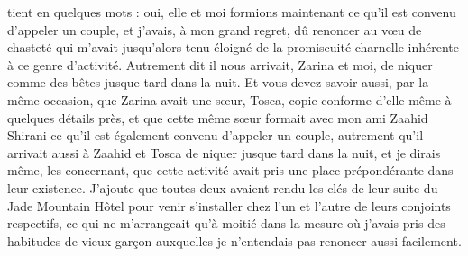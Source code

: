 tient en quelques mots : oui, elle et moi formions maintenant ce qu’il est convenu d’appeler un couple, et j’avais, à mon grand regret, dû renoncer au vœu de chasteté qui m’avait jusqu’alors tenu éloigné de la promiscuité charnelle inhérente à ce genre d’activité. Autrement dit il nous arrivait, Zarina et moi, de niquer comme des bêtes jusque tard dans la nuit. Et vous devez savoir aussi, par la même occasion, que Zarina avait une sœur, Tosca, copie conforme d’elle-même à quelques détails près, et que cette même sœur formait avec mon ami Zaahid Shirani ce qu’il est également convenu d’appeler un couple, autrement qu’il arrivait aussi à Zaahid et Tosca de niquer jusque tard dans la nuit, et je dirais même, les concernant, que cette activité avait pris une place prépondérante dans leur existence. J’ajoute que toutes deux avaient rendu les clés de leur suite du Jade Mountain Hôtel pour venir s’installer chez l’un et l’autre de leurs conjoints respectifs, ce qui ne m’arrangeait qu’à moitié dans la mesure où j’avais pris des habitudes de vieux garçon auxquelles je n’entendais pas renoncer aussi facilement.

